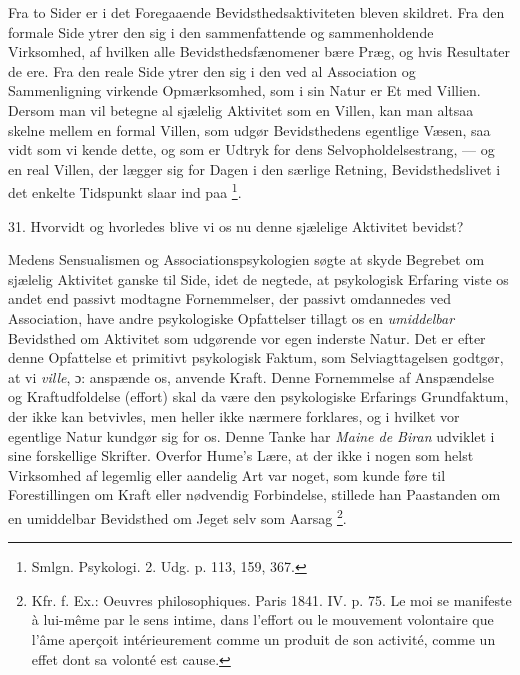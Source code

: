 \documentclass[12pt,a4paper,openany]{book}
\begin{document}
Fra to Sider er i det Foregaaende Bevidsthedsaktiviteten bleven skildret. Fra
den formale Side ytrer den sig i den sammenfattende og sammenholdende
Virksomhed, af hvilken alle Bevidsthedsfænomener bære Præg, og hvis Resultater
de ere. Fra den reale Side ytrer den sig i den ved al Association og
Sammenligning virkende Opmærksomhed, som i sin Natur er Et med Villien. Dersom
man vil betegne al sjælelig Aktivitet som en Villen, kan man altsaa skelne
mellem en formal Villen, som udgør Bevidsthedens egentlige Væsen, saa vidt som
vi kende dette, og som er Udtryk for dens Selvopholdelsestrang, --- og en real
Villen, der lægger sig for Dagen i den særlige Retning, Bevidsthedslivet i det
enkelte Tidspunkt slaar ind paa%
\footnote[1]{Smlgn. Psykologi. 2. Udg. p. 113, 159, 367.}.

31. Hvorvidt og hvorledes blive vi os nu denne sjælelige Aktivitet bevidst?

Medens Sensualismen og Associationspsykologien søgte at skyde Begrebet om
sjælelig Aktivitet ganske til Side, idet de negtede, at psykologisk Erfaring
viste os andet end passivt modtagne Fornemmelser, der passivt omdannedes ved
Association, have andre psykologiske Opfattelser tillagt os en
\emph{umiddelbar} Bevidsthed om Aktivitet som udgørende vor egen inderste
Natur. Det er efter denne Opfattelse et primitivt psykologisk Faktum, som
Selviagttagelsen godtgør, at vi \emph{ville}, ɔ: anspænde os, anvende Kraft.
Denne Fornemmelse af Anspændelse og Kraftudfoldelse (effort) skal da være den
psykologiske Erfarings Grundfaktum, der ikke kan betvivles, men heller ikke
nærmere forklares, og i hvilket vor egentlige Natur kundgør sig for os. Denne
Tanke har \emph{Maine de Biran} udviklet i sine forskellige Skrifter. Overfor
Hume's Lære, at der ikke i nogen som helst Virksomhed af legemlig eller
aandelig Art var noget, som kunde føre til Forestillingen om Kraft eller
nødvendig Forbindelse, stillede han Paastanden om en umiddelbar Bevidsthed om
Jeget selv som Aarsag%
\footnote[2]{Kfr. f. Ex.: Oeuvres philosophiques. Paris 1841. IV. p. 75. Le moi
se manifeste à lui-même par le sens intime, dans l'effort ou le mouvement
volontaire que l'âme aperçoit intérieurement comme un produit de son activité,
comme un effet dont sa volonté est cause.}.
\end{document}
